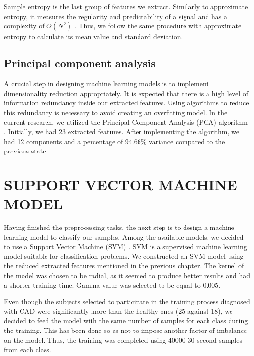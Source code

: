 Sample entropy is the last group of features we extract. Similarly to approximate entropy, it measures the regularity and predictability of a signal and has a complexity of $O(N^2)$ \cite{sampEn_article}. Thus, we follow the same procedure with approximate entropy to calculate its mean value and standard deviation.
%
\subsection{Principal component analysis}
\label{ssec:pca}
A crucial step in designing machine learning models is to implement dimensionality reduction appropriately. It is expected that there is a high level of information redundancy inside our extracted features. Using algorithms to reduce this redundancy is necessary to avoid creating an overfitting model. In the current research, we utilized the Principal Component Analysis (PCA) algorithm \cite{pca_article}. Initially, we had 23 extracted features. After implementing the algorithm, we had 12 components and a percentage of 94.66\% variance compared to the previous state.
%
\section{SUPPORT VECTOR MACHINE MODEL}
\label{sec:svm}
Having finished the preprocessing tasks, the next step is to design a machine learning model to classify our samples. Among the available models, we decided to use a Support Vector Machine (SVM) \cite{svm_article}. SVM is a supervised machine learning model suitable for classification problems. We constructed an SVM model using the reduced extracted features mentioned in the previous chapter. The kernel of the model was chosen to be radial, as it seemed to produce better results and had a shorter training time. Gamma value was selected to be equal to 0.005. 

Even though the subjects selected to participate in the training process diagnosed with CAD were significantly more than the healthy ones (25 against 18), we decided to feed the model with the same number of samples for each class during the training. This has been done so as not to impose another factor of imbalance on the model. Thus, the training was completed using 40000 30-second samples from each class.
%
